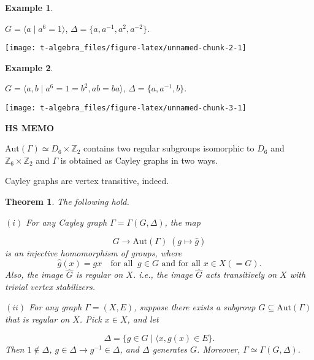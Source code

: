 \documentclass[
]{book}
\newtheorem{theorem}{Theorem}[chapter]
\theoremstyle{definition}
\theoremstyle{definition}
\newtheorem{example}{Example}[chapter]
\theoremstyle{definition}
\theoremstyle{definition}
\theoremstyle{remark}
\begin{document}
\begin{example}
\protect\hypertarget{exm:k6minus1}{}\label{exm:k6minus1}

\(G = \langle a \mid a^6 = 1\rangle\), \(\Delta = \{a, a^{-1}, a^2, a^{-2}\}\).

\begin{center}\texttt{[image: t-algebra\_files/figure-latex/unnamed-chunk-2-1]} \end{center}

\end{example}

\begin{example}
\protect\hypertarget{exm:d6}{}\label{exm:d6}

\(G = \langle a, b \mid a^6 = 1 = b^2, ab = ba\rangle\), \(\Delta = \{a, a^{-1}, b\}\).

\begin{center}\texttt{[image: t-algebra\_files/figure-latex/unnamed-chunk-3-1]} \end{center}

\end{example}

\textbf{HS MEMO}

\(\mathrm{Aut}(\Gamma) \simeq D_6\times \mathbb{Z}_2\) contains two regular subgroups isomorphic to \(D_6\) and \(\mathbb{Z}_6 \times \mathbb{Z}_2\) and \(\Gamma\) is obtained as Cayley graphs in two ways.

Cayley graphs are vertex transitive, indeed.

\begin{theorem}
\protect\hypertarget{thm:cayley-graph}{}\label{thm:cayley-graph}The following hold.

\((i)\) For any Cayley graph \(\Gamma = \Gamma(G, \Delta)\), the map

\[G \to \mathrm{Aut}(\Gamma) \; (g\mapsto \hat{g})\]
is an injective homomorphism of groups, where
\[\hat{g}(x) = gx \quad \textrm{for all }\: g\in G \textrm{ and for all } x\in X (= G).\]
Also, the image \(\hat{G}\) is regular on \(X\). i.e., the image \(\hat{G}\) acts transitively on \(X\) with trivial vertex stabilizers.

\((ii)\) For any graph \(\Gamma = (X, E)\), suppose there exists a subgroup \(G \subseteq \mathrm{Aut}(\Gamma)\) that is regular on \(X\). Pick \(x\in X\), and let

\[\Delta = \{g\in G\mid \langle x, g(x)\in E\}.\]
Then \(1\not\in \Delta\), \(g\in \Delta \to g^{-1}\in \Delta\), and \(\Delta\) generates \(G\). Moreover, \(\Gamma \simeq \Gamma(G, \Delta)\).
\end{theorem}
\end{document}
